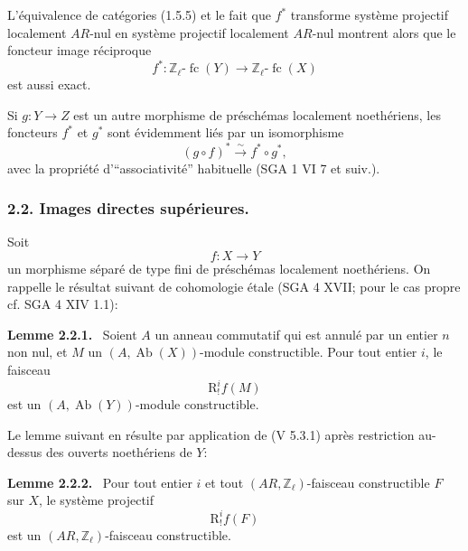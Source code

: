 \documentclass[11pt]{article}
\newenvironment{statement}[1]{\par\medskip\noindent\textbf{#1.}\ }{\par\medskip}
\providecommand{\Ab}{\operatorname{Ab}}
\providecommand{\fc}{\operatorname{fc}}
\providecommand{\Ab}{\operatorname{Ab}}
\begin{document}
L'équivalence de catégories (1.5.5) et le fait que \(f^*\) transforme système projectif localement \(AR\)-nul en système projectif localement \(AR\)-nul montrent alors que le foncteur image réciproque
\[
f^*:\mathbb Z_\ell\text{-}\fc(Y)\longrightarrow \mathbb Z_\ell\text{-}\fc(X)
\]
est aussi exact.

Si \(g:Y\to Z\) est un autre morphisme de préschémas localement noethériens, les foncteurs \(f^*\) et \(g^*\) sont évidemment liés par un isomorphisme
\[
(g\circ f)^*\xrightarrow{\sim}f^*\circ g^*,
\]
avec la propriété d'``associativité'' habituelle (SGA 1 VI 7 et suiv.).

\subsubsection*{2.2. Images directes supérieures.}

Soit
\[
f:X\longrightarrow Y
\]
un morphisme séparé de type fini de préschémas localement noethériens. On rappelle le résultat suivant de cohomologie étale (SGA 4 XVII; pour le cas propre cf. SGA 4 XIV 1.1):

\begin{statement}{Lemme 2.2.1}
Soient \(A\) un anneau commutatif qui est annulé par un entier \(n\) non nul, et \(M\) un \((A,\Ab(X))\)-module constructible. Pour tout entier \(i\), le faisceau
\[
\mathrm{R}^i_!f(M)
\]
est un \((A,\Ab(Y))\)-module constructible.
\end{statement}

Le lemme suivant en résulte par application de (V 5.3.1) après restriction au-dessus des ouverts noethériens de \(Y\):

\begin{statement}{Lemme 2.2.2}
Pour tout entier \(i\) et tout \((AR,\mathbb Z_\ell)\)-faisceau constructible \(F\) sur \(X\), le système projectif
\[
\mathrm{R}^i_!f(F)
\]
est un \((AR,\mathbb Z_\ell)\)-faisceau constructible.
\end{statement}
\end{document}
